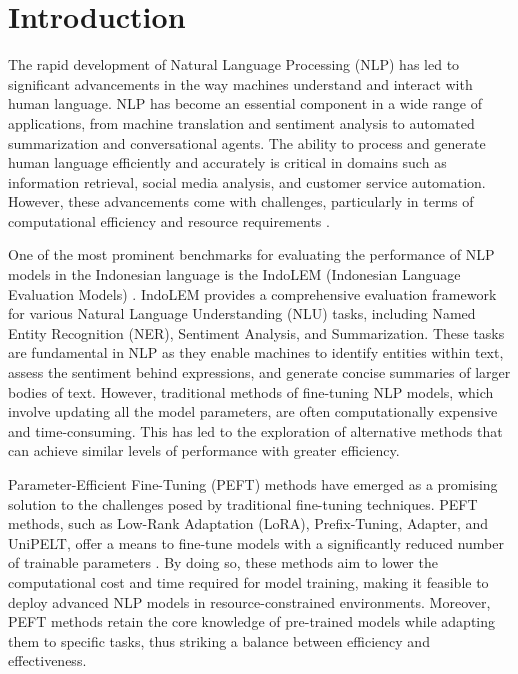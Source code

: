 \section{Introduction}

The rapid development of Natural Language Processing (NLP) has led to significant advancements in the way machines understand and interact with human language. NLP has become an essential component in a wide range of applications, from machine translation and sentiment analysis to automated summarization and conversational agents. The ability to process and generate human language efficiently and accurately is critical in domains such as information retrieval, social media analysis, and customer service automation. However, these advancements come with challenges, particularly in terms of computational efficiency and resource requirements \cite{nlp, ai}.

One of the most prominent benchmarks for evaluating the performance of NLP models in the Indonesian language is the IndoLEM (Indonesian Language Evaluation Models) \cite{indolem}. IndoLEM provides a comprehensive evaluation framework for various Natural Language Understanding (NLU) tasks, including Named Entity Recognition (NER), Sentiment Analysis, and Summarization. These tasks are fundamental in NLP as they enable machines to identify entities within text, assess the sentiment behind expressions, and generate concise summaries of larger bodies of text. However, traditional methods of fine-tuning NLP models, which involve updating all the model parameters, are often computationally expensive and time-consuming. This has led to the exploration of alternative methods that can achieve similar levels of performance with greater efficiency.

Parameter-Efficient Fine-Tuning (PEFT) methods have emerged as a promising solution to the challenges posed by traditional fine-tuning techniques. PEFT methods, such as Low-Rank Adaptation (LoRA), Prefix-Tuning, Adapter, and UniPELT, offer a means to fine-tune models with a significantly reduced number of trainable parameters \cite{adapter_houlsby, prefix_tuning, lora, unipelt}. By doing so, these methods aim to lower the computational cost and time required for model training, making it feasible to deploy advanced NLP models in resource-constrained environments. Moreover, PEFT methods retain the core knowledge of pre-trained models while adapting them to specific tasks, thus striking a balance between efficiency and effectiveness.

